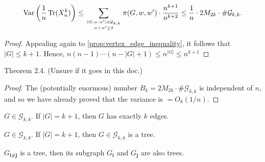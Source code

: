 \begin{proposition}
  \label{prop:var_upper_bound}
  \notready
  \[ \operatorname{Var}\left( \frac1n\operatorname{Tr}({X}_n^k)\right) \le \sum_{(G,w,w')\in\mathcal{G}_{k,k}\atop w+w'\ge 2} \pi(G,w,w')\cdot \frac{n^{k+1}}{n^{k+2}} \le \frac1n\cdot 2M_{2k}\cdot \#\mathcal{G}_{k,k}. \]
\end{proposition}

\begin{proof}
  \notready
  Appealing again to \ref{prop:vertex_edge_inequality}, it follows that $|G|\le k+1$.  Hence, $n(n-1)\cdots(n-|G|+1) \le n^{|G|} \le n^{k+1}$
\end{proof}

\begin{theorem}
  \label{thm:wigner_law_matrix_moments}
  \notready
  Theorem 2.4. (Unsure if it goes in this doc.)
\end{theorem}

\begin{proof}
  \notready
  The (potentially enormous) number $B_k=2M_{2k}\cdot\#\mathcal{G}_{k,k}$ is independent of $n$, and so we have already proved that the variance is $=O_k(1/n)$.
\end{proof}







\begin{lemma}
    \label{lem:exactly_k_edges}
    \notready
    $G \in \mathcal{G}_{k, k}$. If $|G| = k + 1$, then $G$ has exactly $k$ edges.
\end{lemma}


\begin{lemma}
    \label{lem:G_is_tree}
    \notready
    $G \in \mathcal{G}_{k, k}$. If $|G| = k + 1$, then $G \in \mathcal{G}_{k, k}$ is a tree.
\end{lemma}


\begin{lemma}
    \label{lem:subgraph_of_tree}
    \notready
    $G_{\mathbf{i} \# \mathbf{j}}$ is a tree, then its subgraph $G_{\mathbf{i}}$ and $G_{\mathbf{j}}$ are also trees.
\end{lemma}



